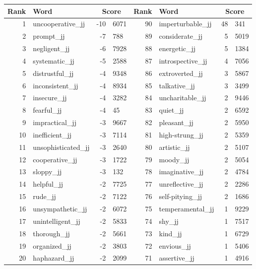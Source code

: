 \begin{table}[tbp]
    \begin{tabular}{| rlr@{.}l | rlr@{.}l |}
    \hline
    \textbf{Rank} & \textbf{Word} & \multicolumn{2}{c|}{\textbf{Score}} & \textbf{Rank} & \textbf{Word} & \multicolumn{2}{c|}{\textbf{Score}} \\
    \hline
    1 & uncooperative\_jj & -10 & 6071    &    90 & imperturbable\_jj & 48 & 341 \\
    2 & prompt\_jj & -7 & 788    &    89 & considerate\_jj & 5 & 5019 \\
    3 & negligent\_jj & -6 & 7928    &    88 & energetic\_jj & 5 & 1384 \\
    4 & systematic\_jj & -5 & 2588    &    87 & introspective\_jj & 4 & 7056 \\
    5 & distrustful\_jj & -4 & 9348    &    86 & extroverted\_jj & 3 & 5867 \\
    6 & inconsistent\_jj & -4 & 8934    &    85 & talkative\_jj & 3 & 3499 \\
    7 & insecure\_jj & -4 & 3282    &    84 & uncharitable\_jj & 2 & 9446 \\
    8 & fearful\_jj & -4 & 45    &    83 & quiet\_jj & 2 & 6592 \\
    9 & impractical\_jj & -3 & 9667    &    82 & pleasant\_jj & 2 & 5950 \\
    10 & inefficient\_jj & -3 & 7114    &    81 & high-strung\_jj & 2 & 5359 \\
    11 & unsophisticated\_jj & -3 & 2640    &    80 & artistic\_jj & 2 & 5107 \\
    12 & cooperative\_jj & -3 & 1722    &    79 & moody\_jj & 2 & 5054 \\
    13 & sloppy\_jj & -3 & 132    &    78 & imaginative\_jj & 2 & 4784 \\
    14 & helpful\_jj & -2 & 7725    &    77 & unreflective\_jj & 2 & 2286 \\
    15 & rude\_jj & -2 & 7122    &    76 & self-pitying\_jj & 2 & 1686 \\
    16 & unsympathetic\_jj & -2 & 6072    &    75 & temperamental\_jj & 1 & 9229 \\
    17 & unintelligent\_jj & -2 & 5833    &    74 & shy\_jj & 1 & 7517 \\
    18 & thorough\_jj & -2 & 5661    &    73 & kind\_jj & 1 & 6729 \\
    19 & organized\_jj & -2 & 3803    &    72 & envious\_jj & 1 & 5406 \\
    20 & haphazard\_jj & -2 & 2099    &    71 & assertive\_jj & 1 & 4916 \\

\end{tabular}
\end{table}
